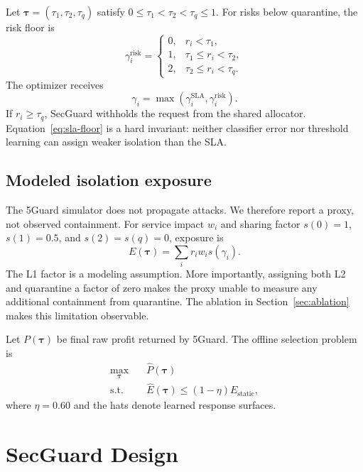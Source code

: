 \documentclass[conference]{IEEEtran}
\begin{document}
Let $\boldsymbol{\tau}=(\tau_1,\tau_2,\tau_q)$ satisfy
$0\leq\tau_1<\tau_2<\tau_q\leq1$. For risks below quarantine, the risk floor is
\begin{equation}
 \gamma_i^{\mathrm{risk}} =
 \begin{cases}
  0, & r_i < \tau_1,\\
  1, & \tau_1\leq r_i < \tau_2,\\
  2, & \tau_2\leq r_i < \tau_q.
 \end{cases}
\end{equation}
The optimizer receives
\begin{equation}
 \gamma_i = \max(\gamma_i^{\mathrm{SLA}},\gamma_i^{\mathrm{risk}}).
 \label{eq:sla-floor}
\end{equation}
If $r_i\geq\tau_q$, SecGuard withholds the request from the shared allocator.
Equation~\eqref{eq:sla-floor} is a hard invariant: neither classifier error nor
threshold learning can assign weaker isolation than the SLA.

\subsection{Modeled isolation exposure}
The 5Guard simulator does not propagate attacks. We therefore report a proxy,
not observed containment. For service impact $w_i$ and sharing factor
$s(0)=1$, $s(1)=0.5$, and $s(2)=s(q)=0$, exposure is
\begin{equation}
 E(\boldsymbol{\tau})=\sum_i r_iw_i s(\gamma_i).
 \label{eq:exposure}
\end{equation}
The L1 factor is a modeling assumption. More importantly, assigning both L2 and
quarantine a factor of zero makes the proxy unable to measure any additional
containment from quarantine. The ablation in Section~\ref{sec:ablation} makes
this limitation observable.

Let $P(\boldsymbol{\tau})$ be final raw profit returned by 5Guard. The offline
selection problem is
\begin{align}
 \max_{\boldsymbol{\tau}}\quad & \widehat{P}(\boldsymbol{\tau}) \\
 \mathrm{s.t.}\quad & \widehat{E}(\boldsymbol{\tau})
 \leq (1-\eta)E_{\mathrm{static}},
 \label{eq:optimization}
\end{align}
where $\eta=0.60$ and the hats denote learned response surfaces.

\section{SecGuard Design}
\end{document}
